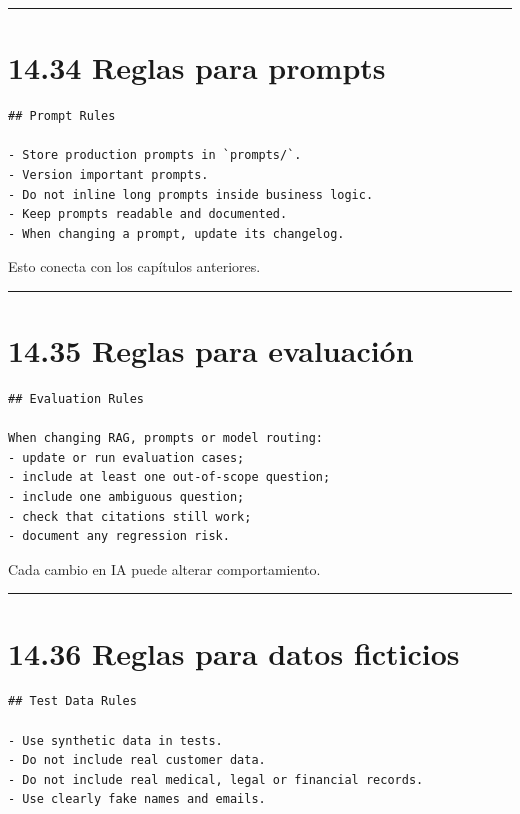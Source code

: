 \begin{center}\rule{0.5\linewidth}{0.5pt}\end{center}

\section{14.34 Reglas para prompts}\label{reglas-para-prompts}

\begin{lstlisting}
## Prompt Rules

- Store production prompts in `prompts/`.
- Version important prompts.
- Do not inline long prompts inside business logic.
- Keep prompts readable and documented.
- When changing a prompt, update its changelog.
\end{lstlisting}

Esto conecta con los capítulos anteriores.

\begin{center}\rule{0.5\linewidth}{0.5pt}\end{center}

\section{14.35 Reglas para evaluación}\label{reglas-para-evaluaciuxf3n}

\begin{lstlisting}
## Evaluation Rules

When changing RAG, prompts or model routing:
- update or run evaluation cases;
- include at least one out-of-scope question;
- include one ambiguous question;
- check that citations still work;
- document any regression risk.
\end{lstlisting}

Cada cambio en IA puede alterar comportamiento.

\begin{center}\rule{0.5\linewidth}{0.5pt}\end{center}

\section{14.36 Reglas para datos
ficticios}\label{reglas-para-datos-ficticios}

\begin{lstlisting}
## Test Data Rules

- Use synthetic data in tests.
- Do not include real customer data.
- Do not include real medical, legal or financial records.
- Use clearly fake names and emails.
\end{lstlisting}

